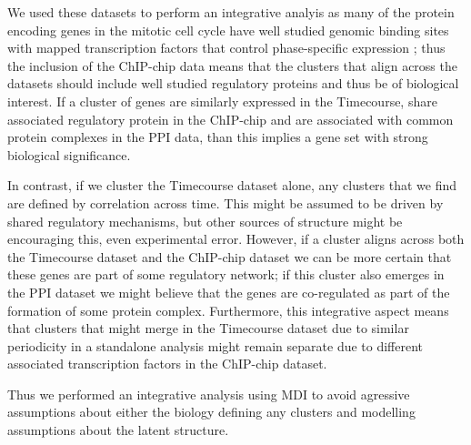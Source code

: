 \documentclass[]{article}
\begin{document}
We used these datasets to perform an integrative analyis as many of the protein encoding genes in the mitotic cell cycle have well studied genomic binding sites with mapped transcription factors that control phase-specific expression \citep{cho1998genome, spellman1998comprehensive}; thus the inclusion of the ChIP-chip data means that the clusters that align across the datasets should include well studied regulatory proteins and thus be of biological interest. If a cluster of genes are similarly expressed in the Timecourse, share associated regulatory protein in the ChIP-chip and are associated with common protein complexes in the PPI data, than this implies a gene set with strong biological significance.

In contrast, if we cluster the Timecourse dataset alone, any clusters that we find are defined by correlation across time. This might be assumed to be driven by shared regulatory mechanisms, but other sources of structure might be encouraging this, even experimental error. However, if a cluster aligns across both the Timecourse dataset and the ChIP-chip dataset we can be more certain that these genes are part of some regulatory network; if this cluster also emerges in the PPI dataset we might believe that the genes are co-regulated as part of the formation of some protein complex. Furthermore, this integrative aspect means that clusters that might merge in the Timecourse dataset due to similar periodicity in a standalone analysis might remain separate due to different associated transcription factors in the ChIP-chip dataset.

Thus we performed an integrative analysis using MDI to avoid agressive assumptions about either the biology defining any clusters and modelling assumptions about the latent structure.

\end{document}

